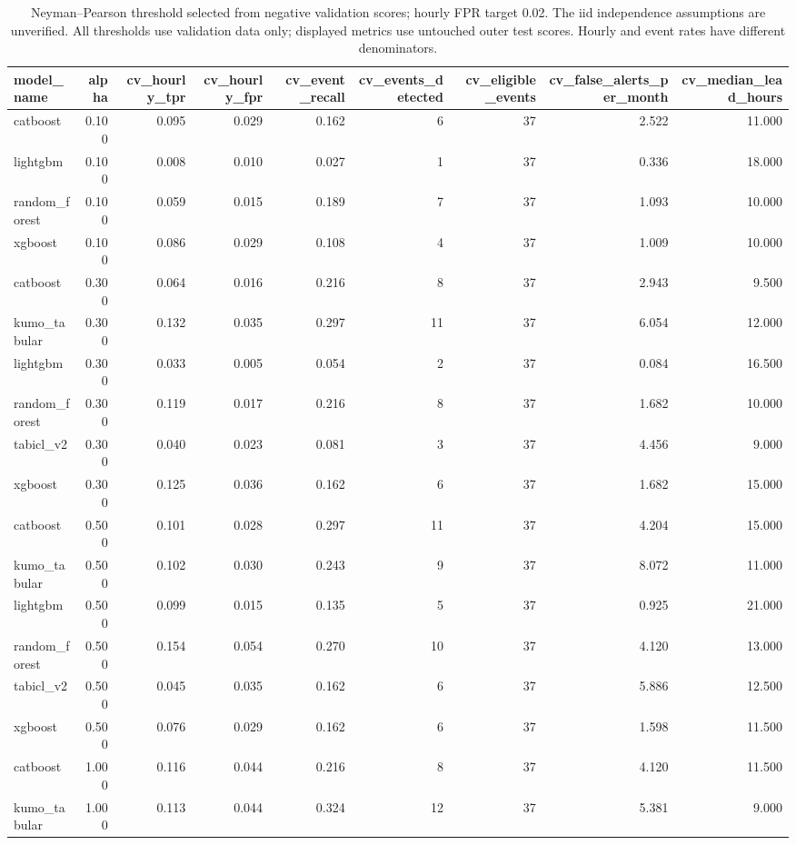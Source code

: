 \begin{table}
\caption{Neyman--Pearson threshold selected from negative validation scores; hourly FPR target 0.02. The iid independence assumptions are unverified. All thresholds use validation data only; displayed metrics use untouched outer test scores. Hourly and event rates have different denominators.}
\begin{tabular}{lrrrrrrrr}
\toprule
model\_name & alpha & cv\_hourly\_tpr & cv\_hourly\_fpr & cv\_event\_recall & cv\_events\_detected & cv\_eligible\_events & cv\_false\_alerts\_per\_month & cv\_median\_lead\_hours \\
\midrule
catboost & 0.100 & 0.095 & 0.029 & 0.162 & 6 & 37 & 2.522 & 11.000 \\
lightgbm & 0.100 & 0.008 & 0.010 & 0.027 & 1 & 37 & 0.336 & 18.000 \\
random\_forest & 0.100 & 0.059 & 0.015 & 0.189 & 7 & 37 & 1.093 & 10.000 \\
xgboost & 0.100 & 0.086 & 0.029 & 0.108 & 4 & 37 & 1.009 & 10.000 \\
catboost & 0.300 & 0.064 & 0.016 & 0.216 & 8 & 37 & 2.943 & 9.500 \\
kumo\_tabular & 0.300 & 0.132 & 0.035 & 0.297 & 11 & 37 & 6.054 & 12.000 \\
lightgbm & 0.300 & 0.033 & 0.005 & 0.054 & 2 & 37 & 0.084 & 16.500 \\
random\_forest & 0.300 & 0.119 & 0.017 & 0.216 & 8 & 37 & 1.682 & 10.000 \\
tabicl\_v2 & 0.300 & 0.040 & 0.023 & 0.081 & 3 & 37 & 4.456 & 9.000 \\
xgboost & 0.300 & 0.125 & 0.036 & 0.162 & 6 & 37 & 1.682 & 15.000 \\
catboost & 0.500 & 0.101 & 0.028 & 0.297 & 11 & 37 & 4.204 & 15.000 \\
kumo\_tabular & 0.500 & 0.102 & 0.030 & 0.243 & 9 & 37 & 8.072 & 11.000 \\
lightgbm & 0.500 & 0.099 & 0.015 & 0.135 & 5 & 37 & 0.925 & 21.000 \\
random\_forest & 0.500 & 0.154 & 0.054 & 0.270 & 10 & 37 & 4.120 & 13.000 \\
tabicl\_v2 & 0.500 & 0.045 & 0.035 & 0.162 & 6 & 37 & 5.886 & 12.500 \\
xgboost & 0.500 & 0.076 & 0.029 & 0.162 & 6 & 37 & 1.598 & 11.500 \\
catboost & 1.000 & 0.116 & 0.044 & 0.216 & 8 & 37 & 4.120 & 11.500 \\
kumo\_tabular & 1.000 & 0.113 & 0.044 & 0.324 & 12 & 37 & 5.381 & 9.000 \\

\end{tabular}
\end{table}
